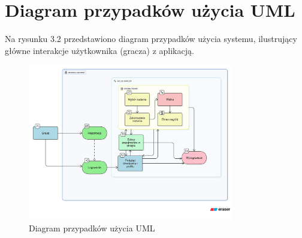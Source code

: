 ﻿%
\chapter{Diagram przypadków użycia UML}

Na rysunku 3.2 przedstawiono diagram przypadków użycia systemu, ilustrujący główne interakcje użytkownika (gracza) z aplikacją.

\begin{figure}[h]
   \centering
   \includegraphics[width=0.8\textwidth]{figures/umldiagram.png}
   \caption{Diagram przypadków użycia UML}
\end{figure}

